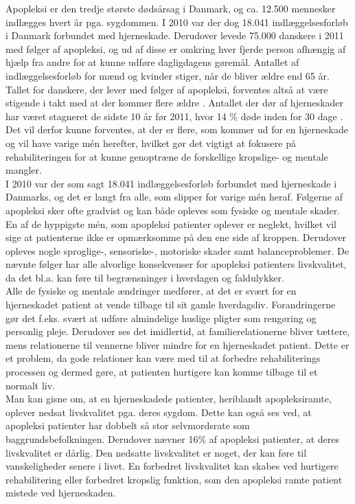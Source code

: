 Apopleksi er den tredje største dødsårsag i Danmark, og ca. 12.500 mennesker indlægges hvert år pga. sygdommen\cite{Hjernesagen2015a}. I 2010 var der dog 18.041 indlæggelsesforløb i Danmark forbundet med hjerneskade\cite{Sundhedsstyrelsen2011}. Derudover levede 75.000 danskere i 2011 med følger af apopleksi, og ud af disse er omkring hver fjerde person afhængig af hjælp fra andre for at kunne udføre dagligdagens gøremål\cite{Hjernesagen2015a}. Antallet af indlæggelsesforløb for mænd og kvinder stiger, når de bliver ældre end 65 år\cite{Sundhedsstyrelsen2011}. Tallet for danskere, der lever med følger af apopleksi, forventes altså at være stigende i takt med at der kommer flere ældre \cite{Sagen2014}. Antallet der dør af hjerneskader har været stagneret de sidste 10 år før 2011, hvor 14 \% døde inden for 30 dage \cite{Hjernesagen2015}. Det vil derfor kunne forventes, at der er flere, som kommer ud for en hjerneskade og vil have varige mén herefter, hvilket gør det vigtigt at fokusere på rehabiliteringen for at kunne genoptræne de forskellige kropslige- og mentale mangler. \\
I 2010 var der som sagt 18.041 indlæggelsesforløb forbundet med hjerneskade i Danmarks, og det er langt fra alle, som slipper for varige mén heraf\cite{Sundhedsstyrelsen2011}. Følgerne af apopleksi sker ofte gradvist og kan både opleves som fysiske og mentale skader\cite{Muus2008}. En af de hyppigste mén, som apopleksi patienter oplever er neglekt, hvilket vil sige at patienterne ikke er opmærksomme på den ene side af kroppen\cite{Sundhed.dk}. Derudover opleves nogle sproglige-, sensoriske-, motoriske skader samt balanceproblemer. De nævnte følger har alle alvorlige konsekvenser for apopleksi patienters livskvalitet, da det bl.a. kan føre til  begrænsninger i hverdagen og faldulykker.\cite{Nichols1997, Muus2008} \\
Alle de fysiske og mentale ændringer medfører, at det er svært for en hjerneskadet patient at vende tilbage til sit gamle hverdagsliv. Forandringerne gør det f.eks. svært at udføre almindelige huslige pligter som rengøring og personlig pleje. Derudover ses det imidlertid, at familierelationerne bliver tættere, mens relationerne til vennerne bliver mindre for en hjerneskadet patient. Dette er et problem, da gode relationer kan være med til at forbedre rehabiliterings processen og dermed gøre, at patienten hurtigere kan komme tilbage til et normalt liv.\cite{Sundhedsstyrelsen2010} \\
Man kan gisne om, at en hjerneskadede patienter, heriblandt apopleksiramte, oplever nedsat livskvalitet pga. deres sygdom. Dette kan også ses ved, at apopleksi patienter har dobbelt så stor selvmordsrate som baggrundsbefolkningen. Derudover nævner 16\% af apopleksi patienter, at deres livskvalitet er dårlig\cite{Sundhedsstyrelsen2010}. Den nedsatte livskvalitet er noget, der kan føre til vanskeligheder senere i livet. En forbedret livskvalitet kan skabes ved hurtigere rehabilitering eller forbedret kropslig funktion, som den apopleksi ramte patient mistede ved hjerneskaden.\cite{Sundhedsstyrelsen2010} \\
